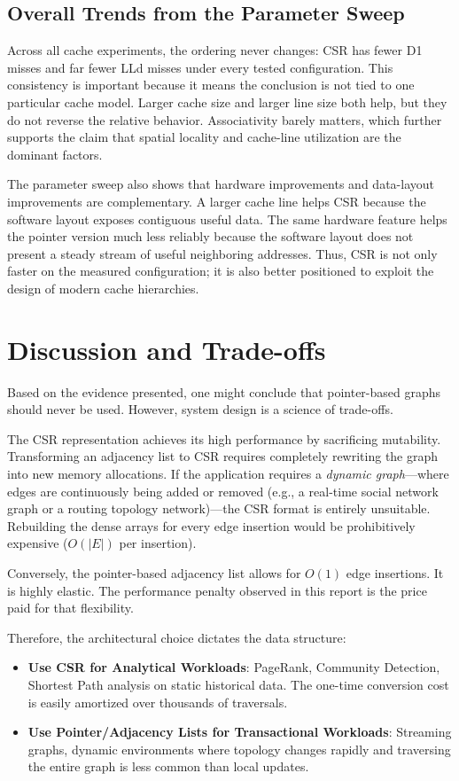 \documentclass[11pt]{article}
\begin{document}
\subsection{Overall Trends from the Parameter Sweep}

Across all cache experiments, the ordering never changes: CSR has fewer D1 misses and far fewer LLd misses under every tested configuration. This consistency is important because it means the conclusion is not tied to one particular cache model. Larger cache size and larger line size both help, but they do not reverse the relative behavior. Associativity barely matters, which further supports the claim that spatial locality and cache-line utilization are the dominant factors.

The parameter sweep also shows that hardware improvements and data-layout improvements are complementary. A larger cache line helps CSR because the software layout exposes contiguous useful data. The same hardware feature helps the pointer version much less reliably because the software layout does not present a steady stream of useful neighboring addresses. Thus, CSR is not only faster on the measured configuration; it is also better positioned to exploit the design of modern cache hierarchies.

\section{Discussion and Trade-offs}

Based on the evidence presented, one might conclude that pointer-based graphs should never be used. However, system design is a science of trade-offs. 

The CSR representation achieves its high performance by sacrificing mutability. Transforming an adjacency list to CSR requires completely rewriting the graph into new memory allocations. If the application requires a \textit{dynamic graph}---where edges are continuously being added or removed (e.g., a real-time social network graph or a routing topology network)---the CSR format is entirely unsuitable. Rebuilding the dense arrays for every edge insertion would be prohibitively expensive ($O(|E|)$ per insertion).

Conversely, the pointer-based adjacency list allows for $O(1)$ edge insertions. It is highly elastic. The performance penalty observed in this report is the price paid for that flexibility.

Therefore, the architectural choice dictates the data structure:
\begin{itemize}
    \item \textbf{Use CSR for Analytical Workloads}: PageRank, Community Detection, Shortest Path analysis on static historical data. The one-time conversion cost is easily amortized over thousands of traversals.
    \item \textbf{Use Pointer/Adjacency Lists for Transactional Workloads}: Streaming graphs, dynamic environments where topology changes rapidly and traversing the entire graph is less common than local updates.
\end{itemize}
\end{document}
